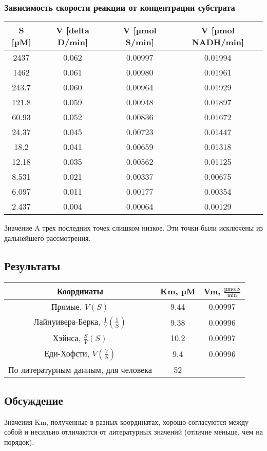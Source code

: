 \subsubsection{Зависимость скорости реакции от концентрации субстрата}
\begin{tabular}{|c|c|c|c|}
\hline
S [µM] &
V [delta D/min] &
V [µmol S/min] &
V [µmol NADH/min] \\
\hline
2437  & 0.062 &  0.00997 & 0.01994 \\
1462  & 0.061 &  0.00980 & 0.01961 \\
243.7 & 0.060 &  0.00964 & 0.01929 \\
121.8 & 0.059 &  0.00948 & 0.01897 \\
60.93 & 0.052 &  0.00836 & 0.01672 \\
24.37 & 0.045 &  0.00723 & 0.01447 \\
18.2  & 0.041 &  0.00659 & 0.01318 \\
12.18 & 0.035 &  0.00562 & 0.01125 \\
8.531 & 0.021 &  0.00337 & 0.00675 \\
6.097 & 0.011 &  0.00177 & 0.00354 \\
2.437 & 0.004 &  0.00064 & 0.00129 \\
\hline
\end{tabular}

Значение A трех последних точек слишком низкое.
Эти точки были исключены из дальнейшего рассмотрения.









\subsection{Результаты}

\begin{tabular}{|c|c|c|}
\hline
Координаты & Km, µM & Vm, $\frac{\text{µmol} S}{\text{min}}$ \\
\hline
Прямые,           $V(S)$                       & 9.44 & 0.00997 \\
Лайнуивера-Берка, $\frac{1}{V}(\frac{1}{S})$   & 9.38 & 0.00996 \\
Хэйнса,           $\frac{S}{V}(S)$             & 10.2 & 0.00997 \\
Еди-Хофсти,       $V(\frac{V}{S})$             & 9.4  & 0.00996 \\
\hline
По литературным данным, для человека \cite{uniprot-human}
                                               & 52 & \\
\hline
\end{tabular}

\subsection{Обсуждение}
Значения Km, полученные в разных координатах, хорошо согласуются между собой
и несильно отличаются от литературных значений (отличие меньше, чем на порядок).

